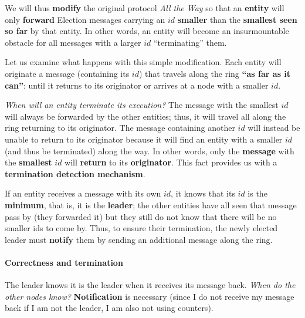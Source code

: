 
We will thus \textbf{modify} the original protocol \textit{All the Way} so that an \textbf{entity} will only \textbf{forward} Election messages carrying an $id$ \textbf{smaller} than the \textbf{smallest seen so far} by that entity. In other words, an entity will become an insurmountable obstacle for all messages with a larger $id$ “terminating” them. 


Let us examine what happens with this simple modification. Each entity will originate a message (containing its $id$) that travels along the ring \textbf{“as far as it can”}: until it returns to its originator or arrives at a node with a smaller $id$. 

\textit{When will an entity terminate its execution?} The message with the smallest $id$ will always be forwarded by the other entities; thus, it will travel all along the ring returning to its originator. The message containing another $id$ will instead be unable to return to its originator because it will find an entity with a smaller $id$ (and thus be terminated) along the way. In other words, only the \textbf{message} with the \textbf{smallest} $id$ will \textbf{return} to its \textbf{originator}. This fact provides us with a \textbf{termination detection mechanism}. 

If an entity receives a message with its own $id$, it knows that its $id$ is the \textbf{minimum}, that is, it is the \textbf{leader}; the other entities have all seen that message pass by (they forwarded it) but they still do not know that there will be no smaller ids to come by. Thus, to ensure their termination, the newly elected leader must \textbf{notify} them by sending an additional message along the ring.



\paragraph{Correctness and termination}
The leader knows it is the leader when it receives its message back. \textit{When do the other nodes know?} \textbf{Notification} is necessary (since I do not receive my message back if I am not the leader, I am also not using counters).

